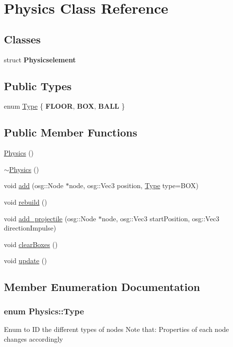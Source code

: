 \hypertarget{class_physics}{
\section{Physics Class Reference}
\label{class_physics}
}
\subsection*{Classes}
\begin{DoxyCompactItemize}
\item 
struct {\bfseries Physicselement}
\end{DoxyCompactItemize}
\subsection*{Public Types}
\begin{DoxyCompactItemize}
\item 
enum \hyperlink{class_physics_abd2a93b7674376b592308c70a4d0722a}{Type} \{ {\bfseries FLOOR}, 
{\bfseries BOX}, 
{\bfseries BALL}
 \}
\end{DoxyCompactItemize}
\subsection*{Public Member Functions}
\begin{DoxyCompactItemize}
\item 
\hyperlink{class_physics_a4b2ebc0a344f04f48d227c72f0d0fbda}{Physics} ()
\item 
\hyperlink{class_physics_a045c3788e28059d3920136499942490f}{$\sim$Physics} ()
\item 
void \hyperlink{class_physics_a9bf392c23a2e01bbd0fa99804e06d3ba}{add} (osg::Node $\ast$node, osg::Vec3 position, \hyperlink{class_physics_abd2a93b7674376b592308c70a4d0722a}{Type} type=BOX)
\item 
void \hyperlink{class_physics_afe2651aeeb5fcb01189f42d04c79692e}{rebuild} ()
\item 
void \hyperlink{class_physics_a4b834cb27b02c73026d8c45da29a193e}{add\_\-projectile} (osg::Node $\ast$node, osg::Vec3 startPosition, osg::Vec3 directionImpulse)
\item 
void \hyperlink{class_physics_acd1a87f8356086e412b3be849860a687}{clearBoxes} ()
\item 
void \hyperlink{class_physics_a309579d8a466dbcc36c6b4db136b1e9b}{update} ()
\end{DoxyCompactItemize}


\subsection{Member Enumeration Documentation}
\hypertarget{class_physics_abd2a93b7674376b592308c70a4d0722a}{
\subsubsection[{Type}]{\setlength{\rightskip}{0pt plus 5cm}enum {\bf Physics::Type}}}
\label{class_physics_abd2a93b7674376b592308c70a4d0722a}
Enum to ID the different types of nodes Note that: Properties of each node changes accordingly 

